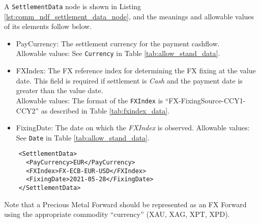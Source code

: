 A \lstinline!SettlementData! node is shown in Listing \ref{lst:comm_ndf_settlement_data_node}, and the meanings and allowable values of its elements follow below.

\begin{itemize}
\item PayCurrency: The settlement currency for the payment cashflow. \\
Allowable values:  See \lstinline!Currency! in Table \ref{tab:allow_stand_data}.
\item FXIndex: The FX reference index for determining the FX fixing at the value date. This field is required if settlement is \emph{Cash} and the payment date is greater than the value date. \\
Allowable values: The format of the \lstinline!FXIndex! is ``FX-FixingSource-CCY1-CCY2'' as described in Table \ref{tab:fxindex_data}.
\item FixingDate: The date on which the \emph{FXIndex} is observed.
Allowable values: See \lstinline!Date! in Table \ref{tab:allow_stand_data}.
\end{itemize}

\begin{listing}[H]
  \begin{verbatim}
    <SettlementData>
      <PayCurrency>EUR</PayCurrency>
      <FXIndex>FX-ECB-EUR-USD</FXIndex>
      <FixingDate>2021-05-28</FixingDate>
    </SettlementData>
  \end{verbatim}
  \caption{Example \lstinline!SettlementData! node with \lstinline!Rules! sub-node}
  \label{lst:comm_ndf_settlement_data_node}
\end{listing}

Note that a Precious Metal Forward should be represented as an FX Forward using the appropriate commodity ``currency'' (XAU, XAG, XPT, XPD).
